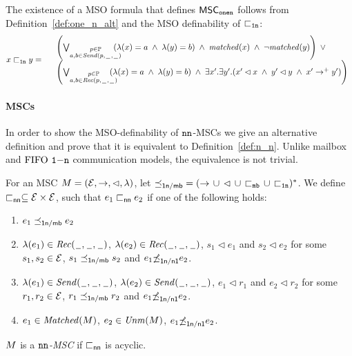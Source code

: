 The existence of a MSO formula that defines $\onenMSCs$ follows from Definition~\ref{def:one_n_alt} and the MSO definability
of $\onenrel$:
\[
x \onenrel y =
\begin{array}{rl}
& \left(
	\bigvee_{\substack{p \in \Procs\\a,b \in \psAct{p}}}\hspace{-1em}
	(\lambda(x) = a \;\wedge\; \lambda(y) = b)
	\;\wedge\; \mathit{matched}(x) \;\wedge\; \neg \mathit{matched}(y)
\right) \;\vee\\
& \left(
	\bigvee_{\substack{p \in \Procs\\a,b \in \prAct{p}}}\hspace{-1em}
	(\lambda(x) = a \;\wedge\; \lambda(y) = b)
	\;\wedge\;
	\exists x'.\exists y'. (x' \lhd x \;\wedge\; y' \lhd y \;\wedge\; x' \procrel^+ y')
\right)\\
\end{array}
\]


\paragraph{\bf \nn MSCs}

In order to show the MSO-definability of $\nnsymb$-MSCs we give an alternative definition and prove that it is equivalent to Definition~\ref{def:n_n}. Unlike mailbox and $\onen$ communication models, the equivalence is not trivial.

\begin{definition} \label{def:n_n_alt}
	For an MSC $\msc = (\Events,\procrel,\lhd,\lambda)$, let ${\nnrel} = ({\procrel} \,\cup\, {\lhd} \,\cup\, {\mbrel} \,\cup\, {\onenrel})^\ast$. We define  $\nnbowtie \subseteq \Events \times \Events$,  such that $e_1 \nnbowtie e_2$ if one of the following holds:
	\begin{enumerate}%
		\item $e_1 \nnrel e_2$
		\item $\lambda(e_1) \in \prAct{\plh}$, $\lambda(e_2) \in \prAct{\plh}$, $s_1 \lhd e_1$ and $s_2 \lhd e_2$ for some $s_1,s_2 \in \Events$, $s_1 \nnrel s_2$ and $e_1 \notnnrel e_2$.
		\item $\lambda(e_1) \in \psAct{\plh}$, $\lambda(e_2) \in \psAct{\plh}$, $e_1 \lhd r_1$ and $e_2 \lhd r_2$ for some $r_1,r_2 \in \Events$, $r_1 \nnrel r_2$ and $e_1 \notnnrel e_2$.
		\item $e_1 \in \Matched{\msc}$, $e_2 \in \Unm{\msc}$, $e_1 \notnnrel e_2$.
	\end{enumerate}

	$\msc $ is a \emph{$\nnsymb$-MSC}
	if ${\nnbowtie}$ is acyclic.
\end{definition}

